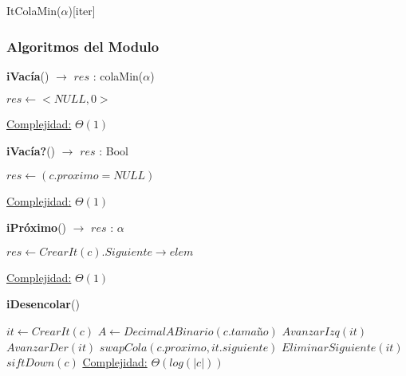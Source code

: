 \begin{Estructura}{ItColaMin($\alpha$)}[iter]
\subsubsection{Algoritmos del Modulo}

\begin{algorithm}[H]{\textbf{iVacía}() $\to$ $res$ : colaMin($\alpha$)}
    	\begin{algorithmic}[1]
			\State $res \gets <NULL, 0>$ 
			
			\medskip
			\Statex \underline{Complejidad:} $\Theta(1)$
    	\end{algorithmic}
\end{algorithm}

\begin{algorithm}[H]{\textbf{iVacía?}() $\to$ $res$ : Bool}
    	\begin{algorithmic}[1]
			\State $res \gets (c.proximo = NULL)$ 
			
			\medskip
			\Statex \underline{Complejidad:} $\Theta(1)$
    	\end{algorithmic}
\end{algorithm}

\begin{algorithm}[H]{\textbf{iPróximo}() $\to$ $res$ : $\alpha$}
    	\begin{algorithmic}[1]
			\State $res \gets CrearIt(c).Siguiente \rightarrow elem$ 
			
			\medskip
			\Statex \underline{Complejidad:} $\Theta(1)$
    	\end{algorithmic}
\end{algorithm}

\begin{algorithm}[H]{\textbf{iDesencolar}()}
    	\begin{algorithmic}[1]
			\State $it \leftarrow CrearIt(c) $ 
			\State $A \leftarrow DecimalABinario(c.tamaño) $ 
			 
					\State $AvanzarIzq(it) $ 
				\Else
					\State $AvanzarDer(it) $ 
				\EndIf
			\EndFor
			\State $swapCola(c.proximo, it.siguiente) $ 
			\State $EliminarSiguiente(it) $ 
				\State $siftDown(c) $ 
			\EndIf
			\medskip
			\Statex \underline{Complejidad:} $\Theta(log(|c|))$
    	\end{algorithmic}
\end{algorithm}


\end{Estructura}

